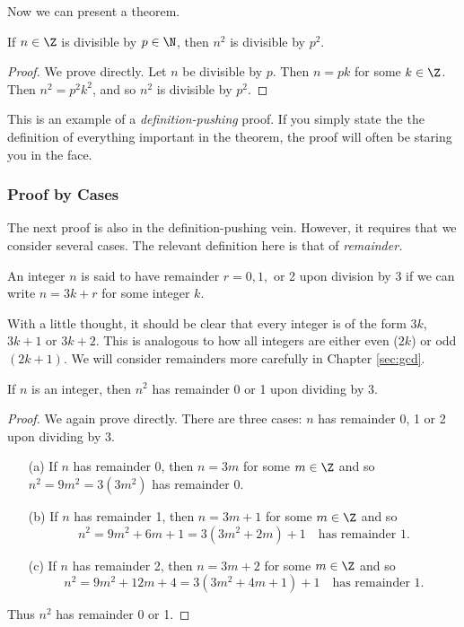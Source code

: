 \noindent Now we can present a theorem.

\begin{thm}
If $n\in\Z$ is divisible by $p\in\N$, then $n^2$ is divisible by $p^2$.
\end{thm}

\begin{proof}
We prove directly. Let $n$ be divisible by $p$. Then $n=pk$ for some $k\in\Z$. Then $n^2=p^2k^2$, and so $n^2$ is divisible by $p^2$.
\end{proof}

\noindent This is an example of a \emph{definition-pushing} proof. If you simply state the the definition of everything important in the theorem, the proof will often be staring you in the face.

\subsubsection*{Proof by Cases}

The next proof is also in the definition-pushing vein. However, it requires that we consider several cases. The relevant definition here is that of \emph{remainder.}

\begin{defn}
An integer $n$ is said to have remainder $r=0,1,$ or 2 upon division by 3 if we can write $n=3k+r$ for some integer $k$.
\end{defn}

\noindent With a little thought, it should be clear that every integer is of the form $3k$, $3k+1$ or $3k+2$. This is analogous to how all integers are either even ($2k$) or odd $(2k+1)$. We will consider remainders more carefully in Chapter \ref{sec:gcd}.

\begin{thm}\label{thm:sqmod3}
If $n$ is an integer, then $n^2$ has remainder 0 or 1 upon dividing by 3.
\end{thm}

\begin{proof}
We again prove directly. There are three cases: $n$ has remainder 0, 1 or 2 upon dividing by 3.
\begin{enumerate}
  \item[(a)] If $n$ has remainder 0, then $n=3m$ for some $m\in\Z$ and so $n^2=9m^2=3(3m^2)$ has remainder 0.
  \item[(b)] If $n$ has remainder 1, then $n=3m+1$ for some $m\in\Z$ and so
  \[n^2=9m^2+6m+1=3(3m^2+2m)+1\quad\text{has remainder 1.}\]
  \item[(c)] If $n$ has remainder 2, then $n=3m+2$ for some $m\in\Z$ and so
  \[n^2=9m^2+12m+4=3(3m^2+4m+1)+1\quad\text{has remainder 1.}\]
\end{enumerate}
Thus $n^2$ has remainder 0 or 1.
\end{proof}

